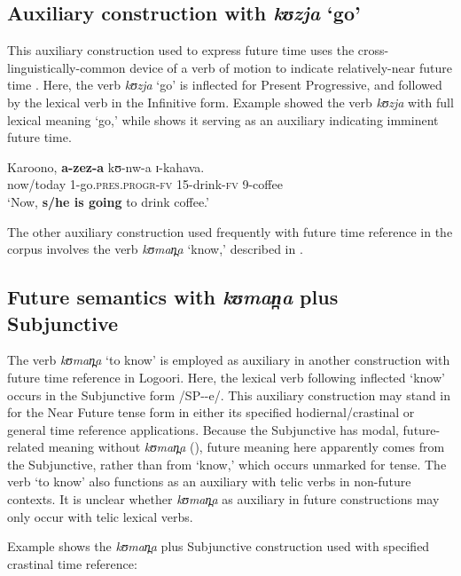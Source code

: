 \documentclass[output=paper]{langsci/langscibook}
\begin{document}
\subsection{Auxiliary construction with \textit{kʊzja} ‘go’} \label{sec:sarvasy:7.2}

This auxiliary construction used to express future time uses the cross-linguistically-common device of a verb of motion to indicate relatively-near future time \citep[161-163]{HeineKuteva2004}. Here, the verb \textit{kʊzja} ‘go’ is inflected for Present Progressive, and followed by the lexical verb in the Infinitive form. Example  showed the verb \textit{kʊzja} with full lexical meaning ‘go,’ while  shows it serving as an auxiliary indicating imminent future time. 

\ea\label{ex:sarvasy:19}
\gll Karoono,   \textbf{a-zez-a}      kʊ-nw-a  ɪ-kahava. \\
now/today  1-go.\textsc{pres.progr-fv}  15-drink-\textsc{fv}  9-coffee \\
\glt ‘Now, \textbf{s/he is going} to drink coffee.’
\z

The other auxiliary construction used frequently with future time reference in the corpus involves the verb \textit{kʊman̪a} ‘know,’ described in .

\subsection{Future semantics with \textit{k}\textit{ʊman̪a}\textit{} plus Subjunctive} \label{sec:sarvasy:7.3}

The verb \textit{kʊman̪a} ‘to know’ is employed as auxiliary in another construction with future time reference in Logoori. Here, the lexical verb following inflected ‘know’ occurs in the Subjunctive form /SP-{\longrule}-e/. This auxiliary construction may stand in for the Near Future tense form in either its specified hodiernal/crastinal or general time reference applications. Because the Subjunctive has modal, future-related meaning without \textit{kʊman̪a} (), future meaning here apparently comes from the Subjunctive, rather than from ‘know,’ which occurs unmarked for tense. The verb ‘to know’ also functions as an auxiliary with telic verbs in non-future contexts. It is unclear whether \textit{kʊman̪a} as auxiliary in future constructions may only occur with telic lexical verbs.

Example  shows the \textit{kʊman̪a} plus Subjunctive construction used with specified crastinal time reference:
\end{document}
